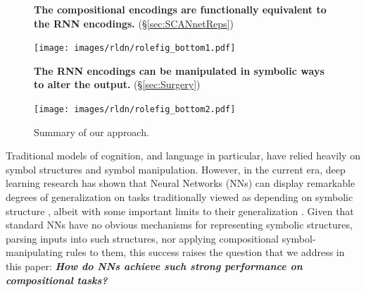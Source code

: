 \begin{figure}
        \begin{tcolorbox}[width=.5\columnwidth, colback={myblue}, coltitle=white, toptitle=3pt, bottomtitle=3pt, colframe={mybluebox},outer arc=2mm,colupper=black, valign=center, halign=left, boxsep = 0pt, title={\textbf{Results:}}, halign title=center, segmentation style={solid, line width=1pt}, left=3pt]
            \def\arraystretch{1.0}%
            
        \textbf{The compositional encodings are functionally equivalent to the RNN encodings.} (\S \ref{sec:SCANnetReps})
    
        \texttt{[image: images/rldn/rolefig\_bottom1.pdf]}
            
        \textbf{The RNN encodings can be manipulated in symbolic ways to alter the output.} (\S \ref{sec:Surgery})
        
        \texttt{[image: images/rldn/rolefig\_bottom2.pdf]}
        
        \end{tcolorbox}
        
        \caption{Summary of our approach.}
        \label{fig:my_label}
    \end{figure}

Traditional models of cognition, and language in particular, have relied heavily on symbol structures and symbol manipulation.
However, in the current era, deep learning research has shown that Neural Networks (NNs) can display remarkable degrees of generalization on tasks traditionally viewed as depending on symbolic structure  \citep{googlenmt, mccoy}, albeit with some important limits to their generalization \citep{lake2018generalization}.
Given that standard NNs have no obvious mechanisms for representing symbolic structures, parsing inputs into such structures, nor applying compositional symbol-manipulating rules to them, this success raises the question that we address in this paper:\textbf{\emph{ How do NNs achieve such strong performance on compositional tasks?}} 

